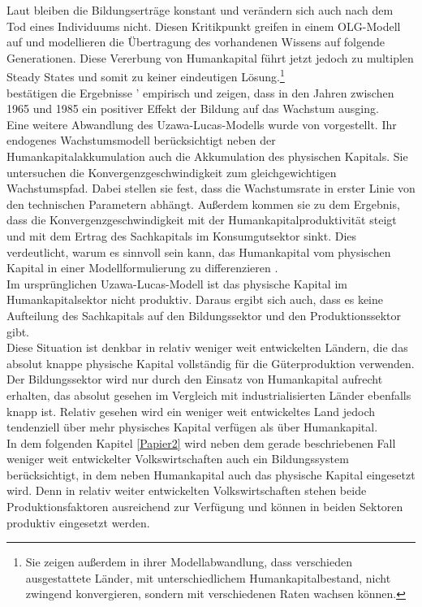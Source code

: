 %
Laut \cite{Lucas.1988} bleiben die Bildungserträge konstant und verändern sich auch nach dem Tod eines Individuums nicht. Diesen Kritikpunkt greifen \cite{Azariades.1990} in einem OLG-Modell auf und modellieren die Übertragung des vorhandenen Wissens auf folgende Generationen. Diese Vererbung von Humankapital führt jetzt jedoch zu multiplen Steady States und somit zu keiner eindeutigen Lösung.\footnote{Sie zeigen außerdem in ihrer Modellabwandlung, dass verschieden ausgestattete Länder, mit unterschiedlichem Humankapitalbestand, nicht zwingend konvergieren, sondern mit verschiedenen Raten wachsen können.}\\
%

\cite{SalaiMartin.1996} bestätigen die Ergebnisse \cite{Lucas.1988}' \citeyear{Lucas.1988} empirisch und zeigen, dass in den Jahren zwischen 1965 und 1985 ein positiver Effekt der Bildung auf das Wachstum ausging.\\
%
Eine weitere Abwandlung des Uzawa-Lucas-Modells wurde von \cite{Ortigueira.1997} vorgestellt. Ihr endogenes Wachstumsmodell berücksichtigt neben der Humankapitalakkumulation auch die Akkumulation des physischen Kapitals. Sie untersuchen die Konvergenzgeschwindigkeit zum gleichgewichtigen Wachstumspfad. Dabei stellen sie fest, dass die Wachstumsrate in erster Linie von den technischen Parametern abhängt. Außerdem kommen sie zu dem Ergebnis, dass die Konvergenzgeschwindigkeit mit der Humankapitalproduktivität steigt und mit dem Ertrag des Sachkapitals im Konsumgutsektor sinkt. Dies verdeutlicht, warum es sinnvoll sein kann, das Humankapital vom physischen Kapital in einer Modellformulierung zu differenzieren \cite{Ortigueira.1997}.\\
%
Im ursprünglichen Uzawa-Lucas-Modell ist das physische Kapital im Humankapitalsektor nicht produktiv. Daraus ergibt sich auch, dass es keine Aufteilung des Sachkapitals auf den Bildungssektor und den Produktionssektor gibt.\\
%
 Diese Situation ist denkbar in relativ weniger weit entwickelten Ländern, die das absolut knappe physische Kapital vollständig für die Güterproduktion verwenden. Der Bildungssektor wird nur durch den Einsatz von Humankapital aufrecht erhalten, das absolut gesehen im Vergleich mit industrialisierten Länder ebenfalls knapp ist. Relativ gesehen wird ein weniger weit entwickeltes Land jedoch tendenziell über mehr physisches Kapital verfügen als über Humankapital. \\
%
In dem folgenden Kapitel \ref{Papier2} wird neben dem gerade beschriebenen Fall weniger weit entwickelter Volkswirtschaften auch ein Bildungssystem berücksichtigt, in dem neben Humankapital auch das physische Kapital eingesetzt wird. Denn in relativ weiter entwickelten Volkswirtschaften stehen beide Produktionsfaktoren ausreichend zur Verfügung und können in beiden Sektoren produktiv eingesetzt werden.
%
